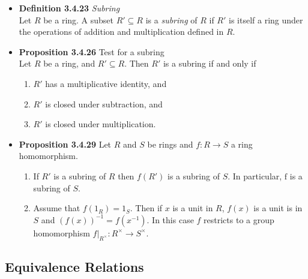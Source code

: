\documentclass[11pt,a4paper]{article}
\begin{document}
\begin{itemize}
    \item \textbf{Definition 3.4.23} \emph{Subring} \\
        Let $R$ be a ring.
        A subset $R' \subseteq R$ is a \emph{subring} of $R$ if $R'$ is itself a ring under the
        operations of addition and multiplication defined in $R$.

    \item \textbf{Proposition 3.4.26} Test for a subring \\
        Let $R$ be a ring, and $R' \subseteq R$.
        Then $R'$ is a subring if and only if
        \begin{enumerate}
            \item $R'$ has a multiplicative identity, and
            \item $R'$ is closed under subtraction, and
            \item $R'$ is closed under multiplication.
        \end{enumerate}

    \item \textbf{Proposition 3.4.29} Let $R$ and $S$ be rings and $f : R \to S$
        a ring homomorphism.
        \begin{enumerate}
            \item If $R'$ is a subring of $R$ then $f(R')$ is a subring of $S$.
                In particular, $\mathrm{f}$ is a subring of $S$.
            \item Assume that $f(1_R) = 1_S$.
                Then if $x$ is a unit in $R$, $f(x)$ is a unit is in $S$ and
                ${(f(x))}^{-1} = f{(x^{-1})}$.
                In this case $f$ restricts to a group homomorphism
                $f|_{R^\times} : R^\times \to S^\times$.
        \end{enumerate}

\end{itemize}

\subsection{Equivalence Relations}
\end{document}

